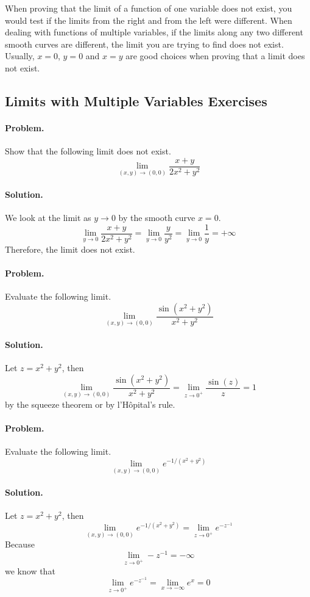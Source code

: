 \documentclass[oneside]{book}
\begin{document}
When proving that the limit of a function of one variable does not exist, you
would test if the limits from the right and from the left were different.
When dealing with functions of multiple variables, if the limits along any two
different smooth curves are different, the limit you are trying to find does
not exist. Usually, \(x = 0\), \(y = 0\) and \(x = y\) are good choices when
proving that a limit does not exist.

\subsection{Limits with Multiple Variables Exercises}

\paragraph{Problem.}
Show that the following limit does not exist.
\[\lim_{\left(x, y\right) \rightarrow \left(0, 0\right)} \frac{x + y}{2x^2 + y^2}\]
\paragraph{Solution.}
We look at the limit as \(y \rightarrow 0\) by the smooth curve \(x = 0\).
\[\lim_{y \rightarrow 0} \frac{x + y}{2x^2 + y^2}
= \lim_{y \rightarrow 0} \frac{y}{y^2}
= \lim_{y \rightarrow 0} \frac{1}{y} = +\infty\]
Therefore, the limit does not exist.

\paragraph{Problem.}
Evaluate the following limit.
\[\lim_{\left(x, y\right) \rightarrow \left(0, 0\right)} \frac{\sin \left(x^2 + y^2\right)}{x^2 + y^2}\]
\paragraph{Solution.}
Let \(z = x^2 + y^2\), then
\[\lim_{\left(x, y\right) \rightarrow \left(0, 0\right)} \frac{\sin \left(x^2 + y^2\right)}{x^2 + y^2}
= \lim_{z \rightarrow 0^+} \frac{\sin \left(z\right)}{z}
= 1\]
by the squeeze theorem or by l'Hôpital's rule.

\paragraph{Problem.}
Evaluate the following limit.
\[\lim_{\left(x, y\right) \rightarrow \left(0, 0\right)} e^{-1/\left(x^2 + y^2\right)}\]
\paragraph{Solution.}
Let \(z = x^2 + y^2\), then
\[\lim_{\left(x, y\right) \rightarrow \left(0, 0\right)} e^{-1/\left(x^2 + y^2\right)}
= \lim_{z \rightarrow 0^+} e^{-z^{-1}}\]
Because \[\lim_{z \rightarrow 0^+} -z^{-1} = -\infty\]
we know that \[\lim_{z \rightarrow 0^+} e^{-z^{-1}} = \lim_{x \rightarrow -\infty} e^{x} = 0\]
\end{document}
